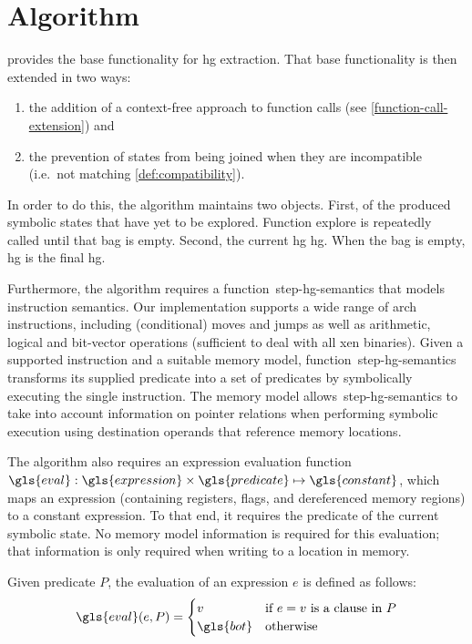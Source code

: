 \section{Algorithm}\label{sec:algorithm}
 provides the base functionality for \ac{hg} extraction.
That base functionality is then extended in two ways:
\begin{enumerate}
  \item the addition of a context-free approach to function calls (see \cref{function-call-extension}) and
  \item the prevention of states from being joined when they are incompatible (i.e.\ not matching \cref{def:compatibility}).
\end{enumerate}
In order to do this, the algorithm maintains two objects.
First,  of the produced symbolic states that have yet to be explored.
Function \gls{explore} is repeatedly called until that \gls{bag} is empty.
Second, the current \ac{hg} \gls{hg}.
When the \gls{bag} is empty, \gls{hg} is the final \ac{hg}.

Furthermore, the algorithm requires a function~\gls{step-hg-semantics} that models instruction semantics.
Our implementation supports a wide range of \gls{arch} instructions,
including (conditional) moves and jumps as well as
arithmetic, logical and bit-vector operations (sufficient to deal with all \gls{xen} binaries).
Given a supported instruction and a suitable memory model,
function~\gls{step-hg-semantics} transforms its supplied predicate
into a set of predicates
by symbolically executing the single instruction.
The memory model allows~\gls{step-hg-semantics} to take into account information on pointer relations
when performing symbolic execution using destination operands
that reference memory locations.


The algorithm also requires an expression evaluation function
$\gls{eval}:\gls{expression}\times\gls{predicate}\mapsto\gls{constant}$,
which maps an expression (containing registers, flags, and dereferenced memory regions)
to a constant expression.
To that end, it requires the predicate of the current symbolic state.
No memory model information is required for this evaluation;
that information is only required when writing to a location in memory.
\begin{definition}\label{def:eval}
  Given predicate $P$, the evaluation of an expression $e$ is defined as follows:
  \begin{equation*}
    \gls{eval}(e,P)=\begin{cases}
      v & \text{if $e = v$ is a clause in }P \\
      \gls{bot} & \text{otherwise}
    \end{cases}
  \end{equation*}
\end{definition}

